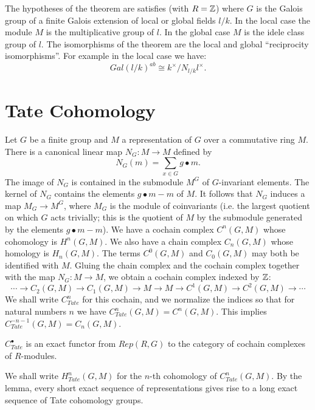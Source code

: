 The hypotheses of the theorem are satisfies (with $R={\mathbb Z}$) where $G$ is the Galois group of
a finite Galois extension of local or global fields $l/k$.
In the local case the module $M$ is the multiplicative group of $l$.
In the global case $M$ is the idele class group of $l$.
The isomorphisms of the theorem are the local and global ``reciprocity isomorphisms''.
For example in the local case we have:
\[
	Gal(l/k)^{ab}
	\cong
	k^\times / N_{l/k}l^\times.
\]









\section{Tate Cohomology}

Let $G$ be a finite group and $M$ a representation of $G$ over a commutative ring $M$.
There is a canonical linear map $N_G : M \to M$ defined by
\[
	N_G(m) = \sum_{x \in G} g \bullet m.
\]
The image of $N_G$ is contained in the submodule $M^G$ of $G$-invariant elements.
The kernel of $N_G$ contains the elements $g \bullet m - m$ of $M$.
It follows that $N_G$ induces a map $M_G \to M^G$, where $M_G$ is the module of coinvariants
(i.e. the largest quotient on which $G$ acts trivially; this is the quotient of $M$ by the
submodule generated by the elements $g \bullet m - m$).
We have a cochain complex $C^n(G,M)$ whose cohomology is $H^n(G,M)$.
We also have a chain complex $C_n(G,M)$ whose homology is $H_n(G,M)$.
The terms $C^0(G,M)$ and $C_0(G,M)$ may both be identified with $M$.
Gluing the chain complex and the cochain complex together with the map $N_G : M \to M$, we obtain
a cochain complex indexed by ${\mathbb Z}$:
\[
	\cdots \to C_2(G,M) \to C_1(G,M) \to M \to M \to C^1(G,M) \to C^2(G,M) \to \cdots
\]
We shall write $C^n_{Tate}$ for this cochain, and we normalize the indices so that for
natural numbers $n$ we have $C^n_{Tate}(G,M) = C^n(G,M)$. This implies
$C^{-n-1}_{Tate}(G,M) = C_n(G,M)$.


\begin{lemma}
  $C^\bullet_{Tate}$ is an exact functor from $Rep(R,G)$ to the category
  of cochain complexes of $R$-modules.
\end{lemma}

We shall write $H^n_{Tate}(G,M)$ for the $n$-th cohomology of $C^n_{Tate}(G,M)$.
By the lemma, every short exact sequence of representations gives rise to a long exact sequence
of Tate cohomology groups.

